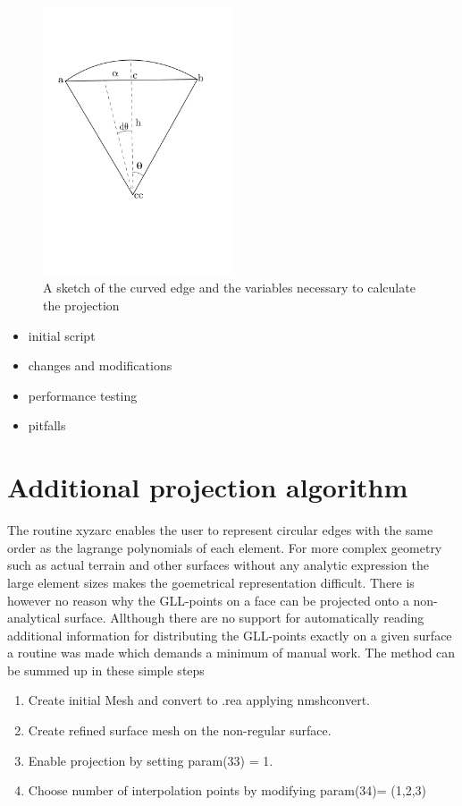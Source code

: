 \begin{figure}[h]
    \centering
    \includegraphics[width = 0.5\textwidth]{Figures/curvature.pdf}
    \caption{A sketch of the curved edge and the variables necessary to calculate the projection}
    \label{fig:curvature}
\end{figure}


\begin{itemize}
	\item initial script
	\item changes and modifications
	\item performance testing
	\item pitfalls
\end{itemize}


\section{Additional projection algorithm}\label{surfpro}
The routine xyzarc enables the user to represent circular edges with the same order as
the lagrange polynomials of each element. For more complex geometry such as actual 
terrain and other surfaces without any analytic expression the large element sizes 
makes the goemetrical representation difficult. There is however no reason why the 
GLL-points on a face can be projected onto a non-analytical surface. Allthough there
are no support for automatically reading additional information for distributing the 
GLL-points exactly on a given surface a routine was made which demands a minimum of 
manual work. The method can be summed up in these simple steps
\begin{enumerate}
    \item Create initial Mesh and convert to .rea applying nmshconvert.
        \item Create refined surface mesh on the non-regular surface.
        \item Enable projection by setting param(33) = 1.
        \item Choose number of interpolation points by modifying param(34)= (1,2,3)
\end{enumerate}

